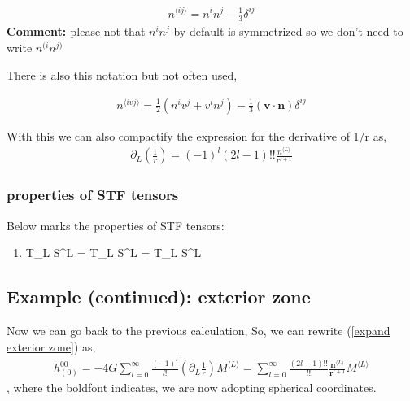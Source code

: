 \documentclass[a4paper, 12pt]{article}
\begin{document}
 \begin{align}
  \label{SFT}
  n^{\langle ij \rangle} = n^i n^j - \frac{1}{3} \delta_{  }^{ij} 
 \end{align}
\textbf{\underline{Comment: }} please not that \( n^{i} n^{j}    \)  by
default is symmetrized so we don't need to write \( n^{(i} n^{j)} \)

 There is also this notation but not often used, 

 \begin{align}
  \label{SFT with v}
   n^{\langle i v j \rangle} = \frac{1}{2} ( n^{i} v^{j} + v^{i} n^{j} ) -
   \frac{1}{3} (\textbf{v} \cdot \textbf{n}) \delta_{  }^{ij}
 \end{align}

With this we can also compactify the expression for the derivative
of 1/r as, 
\begin{align}
  \label{derivative of 1/r in terms of SFT}
  \partial_{L}^{}(\frac{1}{r}) = (-1)^l (2l - 1)!! \frac{n^{\langle
  L\rangle}}{r^{l+1} }
\end{align}
\subsubsection{properties of STF tensors}%
  \label{sub:properties of STF tensors}
  Below marks the properties of STF tensors: 
  \begin{enumerate}
    \item[\circ] T_L S^{\langle L \rangle} = T_{\langle L \rangle}
    S^{\langle L \rangle} = T_{\langle L \rangle} S^L \\
  \end{enumerate}

\subsection{Example (continued): exterior zone}%
  \label{sub:Example (continued): exterior zone}
 Now we can go back to the previous calculation, 
 So, we can rewrite (\ref{expand exterior zone}) as, 
 \begin{align}
  \label{exterior zone expansion with SFT}
   h_{(0)}^{00} = - 4G \sum_{l=0}^{\infty} \frac{(-1)^l}{l!} (
   \partial_{L}^{} \frac{1}{r} ) M^{\langle L \rangle} =
   \sum_{l=0}^{\infty} \frac{(2l-1)!!}{l!}
   \frac{\textbf{n}^{\langle L  \rangle}}{\textbf{r}^{l+1}} M^{\langle
   L\rangle} 
 \end{align}, where the boldfont indicates, we are now adopting spherical
 coordinates. 
\end{document}

